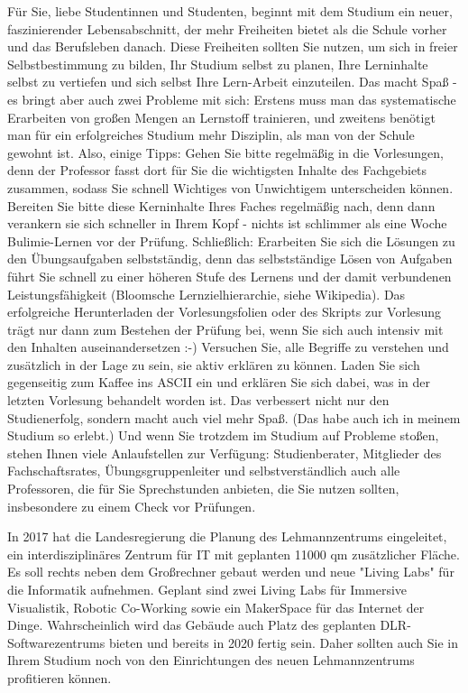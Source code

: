 Für Sie, liebe Studentinnen und Studenten, beginnt mit dem Studium ein neuer, faszinierender Lebensabschnitt, der mehr Freiheiten bietet als die Schule vorher und das Berufsleben danach. Diese Freiheiten sollten Sie nutzen, um sich in freier Selbstbestimmung zu bilden, Ihr Studium selbst zu planen, Ihre Lerninhalte selbst zu vertiefen und sich selbst Ihre Lern-Arbeit einzuteilen. Das macht Spaß - es bringt aber auch zwei Probleme mit sich: Erstens muss man das systematische Erarbeiten von großen Mengen an Lernstoff trainieren, und zweitens benötigt man für ein erfolgreiches Studium mehr Disziplin, als man von der Schule gewohnt ist. Also, einige Tipps: Gehen Sie bitte regelmäßig in die Vorlesungen, denn der Professor fasst dort für Sie die wichtigsten Inhalte des Fachgebiets zusammen, sodass Sie schnell Wichtiges von Unwichtigem unterscheiden können. Bereiten Sie bitte diese Kerninhalte Ihres Faches regelmäßig nach, denn dann verankern sie sich schneller in Ihrem Kopf - nichts ist schlimmer als eine Woche Bulimie-Lernen vor der Prüfung. Schließlich: Erarbeiten Sie sich die Lösungen zu den Übungsaufgaben selbstständig, denn das selbstständige Lösen von Aufgaben führt Sie schnell zu einer höheren Stufe des Lernens und der damit verbundenen Leistungsfähigkeit (Bloomsche Lernzielhierarchie, siehe Wikipedia). Das erfolgreiche Herunterladen der Vorlesungsfolien oder des Skripts zur Vorlesung trägt nur dann zum Bestehen der Prüfung bei, wenn Sie sich auch intensiv mit den Inhalten auseinandersetzen :-) Versuchen Sie, alle Begriffe zu verstehen und zusätzlich in der Lage zu sein, sie aktiv erklären zu können. Laden Sie sich gegenseitig zum Kaffee ins ASCII ein und erklären Sie sich dabei, was in der letzten Vorlesung behandelt worden ist.  Das verbessert nicht nur den Studienerfolg, sondern macht auch viel mehr Spaß. (Das habe auch ich in meinem Studium so erlebt.) Und wenn Sie trotzdem im Studium auf Probleme stoßen, stehen Ihnen viele Anlaufstellen zur Verfügung: Studienberater, Mitglieder des Fachschaftsrates, Übungsgruppenleiter und selbstverständlich auch alle Professoren, die für Sie Sprechstunden anbieten, die Sie nutzen sollten, insbesondere zu einem Check vor Prüfungen.

In 2017 hat die Landesregierung die Planung des Lehmannzentrums eingeleitet, ein interdisziplinäres Zentrum für IT mit geplanten 11000 qm zusätzlicher Fläche. Es soll rechts neben dem Großrechner gebaut werden und neue "Living Labs" für die Informatik aufnehmen. Geplant sind zwei Living Labs für Immersive Visualistik, Robotic Co-Working sowie ein MakerSpace für das Internet der Dinge. Wahrscheinlich wird das Gebäude auch Platz des geplanten DLR-Softwarezentrums bieten und bereits in 2020 fertig sein. Daher sollten auch Sie in Ihrem Studium noch von den Einrichtungen des neuen Lehmannzentrums profitieren können.

